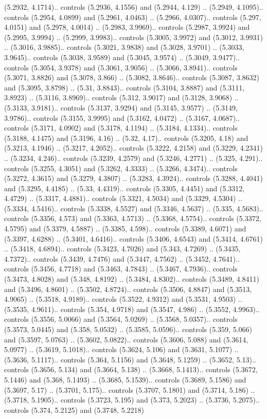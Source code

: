 (5.2932, 4.1714).. controls (5.2936, 4.1556) and (5.2944, 4.129) .. (5.2949, 4.1095).. controls (5.2954, 4.0899) and (5.2961, 4.0463) .. (5.2966, 4.0307).. controls (5.297, 4.0151) and (5.2978, 4.0014) .. (5.2983, 3.9969).. controls (5.2987, 3.9924) and (5.2995, 3.9994) .. (5.2999, 3.9983).. controls (5.3005, 3.9972) and (5.3012, 3.9931) .. (5.3016, 3.9885).. controls (5.3021, 3.9838) and (5.3028, 3.9701) .. (5.3033, 3.9645).. controls (5.3038, 3.9589) and (5.3045, 3.9574) .. (5.3049, 3.9477).. controls (5.3054, 3.9378) and (5.3061, 3.9056) .. (5.3066, 3.8941).. controls (5.3071, 3.8826) and (5.3078, 3.866) .. (5.3082, 3.8646).. controls (5.3087, 3.8632) and (5.3095, 3.8798) .. (5.31, 3.8843).. controls (5.3104, 3.8887) and (5.3111, 3.8923) .. (5.3116, 3.8969).. controls (5.312, 3.9017) and (5.3128, 3.9068) .. (5.3133, 3.9181).. controls (5.3137, 3.9294) and (5.3145, 3.9577) .. (5.3149, 3.9786).. controls (5.3155, 3.9995) and (5.3162, 4.0472) .. (5.3167, 4.0687).. controls (5.3171, 4.0902) and (5.3178, 4.1194) .. (5.3184, 4.1334).. controls (5.3188, 4.1475) and (5.3196, 4.16) .. (5.32, 4.17).. controls (5.3205, 4.18) and (5.3213, 4.1946) .. (5.3217, 4.2052).. controls (5.3222, 4.2158) and (5.3229, 4.2341) .. (5.3234, 4.246).. controls (5.3239, 4.2579) and (5.3246, 4.2771) .. (5.325, 4.291).. controls (5.3255, 4.3051) and (5.3262, 4.3333) .. (5.3266, 4.3474).. controls (5.3272, 4.3615) and (5.3279, 4.3807) .. (5.3283, 4.3924).. controls (5.3288, 4.4041) and (5.3295, 4.4185) .. (5.33, 4.4319).. controls (5.3305, 4.4451) and (5.3312, 4.4729) .. (5.3317, 4.4881).. controls (5.3321, 4.5034) and (5.3329, 4.5304) .. (5.3334, 4.5416).. controls (5.3338, 4.5527) and (5.3346, 4.5637) .. (5.335, 4.5683).. controls (5.3356, 4.573) and (5.3363, 4.5713) .. (5.3368, 4.5754).. controls (5.3372, 4.5795) and (5.3379, 4.5887) .. (5.3385, 4.598).. controls (5.3389, 4.6071) and (5.3397, 4.6288) .. (5.3401, 4.6416).. controls (5.3406, 4.6543) and (5.3414, 4.6761) .. (5.3418, 4.6894).. controls (5.3423, 4.7026) and (5.343, 4.7269) .. (5.3435, 4.7372).. controls (5.3439, 4.7476) and (5.3447, 4.7562) .. (5.3452, 4.7641).. controls (5.3456, 4.7718) and (5.3463, 4.7843) .. (5.3467, 4.7936).. controls (5.3473, 4.8028) and (5.348, 4.8192) .. (5.3484, 4.8302).. controls (5.3489, 4.8411) and (5.3496, 4.8601) .. (5.3502, 4.8724).. controls (5.3506, 4.8847) and (5.3513, 4.9065) .. (5.3518, 4.9189).. controls (5.3522, 4.9312) and (5.3531, 4.9503) .. (5.3535, 4.9611).. controls (5.354, 4.9718) and (5.3547, 4.986) .. (5.3552, 4.9963).. controls (5.3556, 5.0066) and (5.3564, 5.0269) .. (5.3568, 5.0357).. controls (5.3573, 5.0445) and (5.358, 5.0532) .. (5.3585, 5.0596).. controls (5.359, 5.066) and (5.3597, 5.0763) .. (5.3602, 5.0822).. controls (5.3606, 5.088) and (5.3614, 5.0977) .. (5.3619, 5.1018).. controls (5.3624, 5.106) and (5.3631, 5.1077) .. (5.3636, 5.1117).. controls (5.364, 5.1156) and (5.3648, 5.1259) .. (5.3652, 5.13).. controls (5.3656, 5.134) and (5.3664, 5.138) .. (5.3668, 5.1413).. controls (5.3672, 5.1446) and (5.368, 5.1493) .. (5.3685, 5.1539).. controls (5.3689, 5.1586) and (5.3697, 5.17) .. (5.3701, 5.175).. controls (5.3707, 5.1801) and (5.3714, 5.186) .. (5.3718, 5.1905).. controls (5.3723, 5.195) and (5.373, 5.2023) .. (5.3736, 5.2075).. controls (5.374, 5.2125) and (5.3748, 5.2218) 